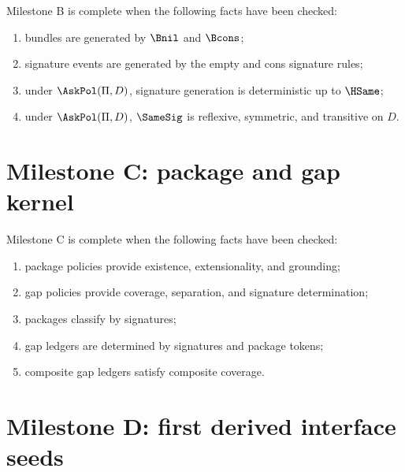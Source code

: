 \begin{protocol}[Milestone B]
\label{prop:milestone-b-signature-kernel}
Milestone B is complete when the following facts have been checked:
\begin{enumerate}
  \item bundles are generated by \(\Bnil\) and \(\Bcons\);
  \item signature events are generated by the empty and cons signature rules;
  \item under \(\AskPol(\Pi,D)\), signature generation is deterministic up to \(\HSame\);
  \item under \(\AskPol(\Pi,D)\), \(\SameSig\) is reflexive, symmetric, and transitive on \(D\).
\end{enumerate}
\end{protocol}

\section{Milestone C: package and gap kernel}

\begin{protocol}[Milestone C]
\label{prop:milestone-c-package-gap-kernel}
Milestone C is complete when the following facts have been checked:
\begin{enumerate}
  \item package policies provide existence, extensionality, and grounding;
  \item gap policies provide coverage, separation, and signature determination;
  \item packages classify by signatures;
  \item gap ledgers are determined by signatures and package tokens;
  \item composite gap ledgers satisfy composite coverage.
\end{enumerate}
\end{protocol}

\section{Milestone D: first derived interface seeds}

